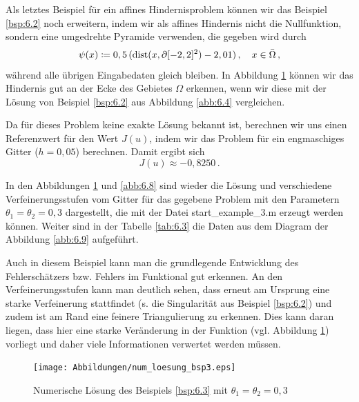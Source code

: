 \begin{bsp}\label{bsp:6.3}
Als letztes Beispiel für ein affines Hindernisproblem können wir das Beispiel \ref{bsp:6.2} noch erweitern, indem wir als affines Hindernis nicht die Nullfunktion, sondern eine umgedrehte Pyramide verwenden, die gegeben wird durch
\[
	\psi (x) \coloneqq 0,5 \,  (\operatorname{dist} (x,\partial [-2,2]^2)-2,01) \, , \quad x \in \bar \Omega \, ,
\]
während alle übrigen Eingabedaten gleich bleiben. In Abbildung \ref{abb:6.7} können wir das Hindernis gut an der Ecke des Gebietes $\Omega$ erkennen, wenn wir diese mit der Lösung von Beispiel \ref{bsp:6.2} aus Abbildung \ref{abb:6.4} vergleichen.

Da für dieses Problem keine exakte Lösung bekannt ist, berechnen wir uns einen Referenzwert für den Wert $J(u)$, indem wir das Problem für ein engmaschiges Gitter ($h=0,05$) berechnen. Damit ergibt sich
\[
	J(u) \approx -0,8250\, .
\]

In den Abbildungen \ref{abb:6.7} und \ref{abb:6.8} sind wieder die Lösung und verschiedene Verfeinerungsstufen vom Gitter für das gegebene Problem mit den Parametern $\theta_1=\theta_2=0,3$ dargestellt, die mit der Datei {\ttfamily start_example_3.m} erzeugt werden können. Weiter sind in der Tabelle \ref{tab:6.3} die Daten aus dem Diagram der Abbildung \ref{abb:6.9} aufgeführt.

Auch in diesem Beispiel kann man die grundlegende Entwicklung des Fehlerschätzers bzw. Fehlers im Funktional gut erkennen. An den Verfeinerungsstufen kann man deutlich sehen, dass erneut am Ursprung  eine starke Verfeinerung stattfindet (s. die Singularität aus Beispiel \ref{bsp:6.2}) und zudem ist am Rand eine feinere Triangulierung zu erkennen. Dies kann daran liegen, dass hier  eine starke Veränderung in der Funktion (vgl. Abbildung \ref{abb:6.7}) vorliegt und daher viele Informationen verwertet werden müssen.


\begin{figure}[h]
\begin{center}
\texttt{[image: Abbildungen/num\_loesung\_bsp3.eps]}
\end{center}
\caption{Numerische Lösung des Beispiels \ref{bsp:6.3} mit $\theta_1=\theta_2 = 0,3$\label{abb:6.7}}
\end{figure}



\end{bsp}
